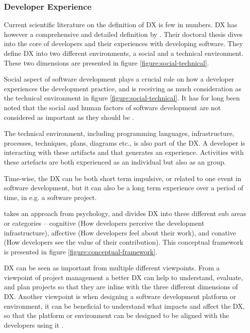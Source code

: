 \documentclass[english, 12pt, a4paper, sci, utf8, a-1b, online]{aaltothesis}
\begin{document}
\subsubsection{Developer Experience}

Current scientific literature on the definition of DX is few in numbers. DX has however a comprehensive and detailed definition by \cite{fagerholm-doctoral-thesis}. Their doctoral thesis dives into the core of developers and their experiences with developing software. They define DX into two different environments, a social and a technical environment. These two dimensions are presented in figure \ref{figure:social-technical}.

Social aspect of software development plays a crucial role on how a developer experiences the development practice, and is receiving as much consideration as the technical environment in figure \ref{figure:social-technical}. It has for long been noted that the social and human factors of software development are not considered as important as they should be \citep{human-factor}.

The technical environment, including programming languages, infrastructure, processes, techniques, plans, diagrams etc., is also part of the DX. A developer is interacting with these artifacts and that generates an experience. Activities with these artefacts are both experienced as an individual but also as an group.

Time-wise, the DX can be both short term impulsive, or related to one event in software development, but it can also be a long term experience over a period of time, in e.g. a software project.

\cite{fagerholm-dx-concept-and-definition} takes an approach from psychology, and divides DX into three different sub areas or categories – cognitive (How developers perceive the development infrastructure), affective (How developers feel about their work), and conative (How developers see the value of their contribution). This conceptual framework is presented in figure \ref{figure:conceptual-framework}.

DX can be seen as important from multiple different viewpoints. From a viewpoint of project management a better DX can help to understand, evaluate, and plan projects so that they are inline with the three different dimensions of DX. Another viewpoint is when designing a software development platform or environment, it can be beneficial to understand what impacts and affect the DX, so that the platform or environment can be designed to be aligned with the developers using it \cite{fagerholm-dx-concept-and-definition}.
\end{document}
